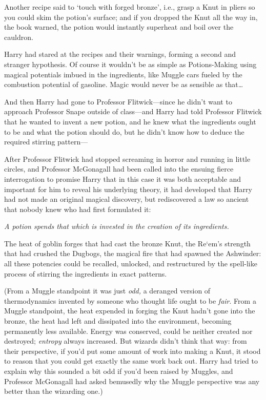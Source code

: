 Another recipe said to `touch with forged bronze', i.e., grasp a Knut in pliers 
so you could skim the potion's surface; and if you dropped the Knut all the way 
in, the book warned, the potion would instantly superheat and boil over the 
cauldron.

Harry had stared at the recipes and their warnings, forming a second and 
stranger hypothesis. Of course it wouldn't be as simple as Potions-Making using 
magical potentials imbued in the ingredients, like Muggle cars fueled by the 
combustion potential of gasoline. Magic would never be as sensible as 
that{\ldots}

And then Harry had gone to Professor Flitwick---since he didn't want to 
approach Professor Snape outside of class---and Harry had told Professor 
Flitwick that he wanted to invent a new potion, and he knew what the 
ingredients ought to be and what the potion should do, but he didn't know how 
to deduce the required stirring pattern---

After Professor Flitwick had stopped screaming in horror and running in little 
circles, and Professor McGonagall had been called into the ensuing fierce 
interrogation to promise Harry that in this case it was both acceptable and 
important for him to reveal his underlying theory, it had developed that Harry 
had not made an original magical discovery, but rediscovered a law so ancient 
that nobody knew who had first formulated it:

\emph{A potion spends that which is invested in the creation of its 
ingredients.}

The heat of goblin forges that had cast the bronze Knut, the Re`em's strength 
that had crushed the Dugbogs, the magical fire that had spawned the Ashwinder: 
all these potencies could be recalled, unlocked, and restructured by the 
spell-like process of stirring the ingredients in exact patterns.

(From a Muggle standpoint it was just \emph{odd,} a deranged version of 
thermodynamics invented by someone who thought life ought to be \emph{fair}. 
From a Muggle standpoint, the heat expended in forging the Knut hadn't gone 
into the bronze, the heat had left and dissipated into the environment, 
becoming permanently less available. Energy was conserved, could be neither 
created nor destroyed; \emph{entropy} always increased. But wizards didn't 
think that way: from their perspective, if you'd put some amount of work into 
making a Knut, it stood to reason that you could get exactly the same work back 
out. Harry had tried to explain why this sounded a bit odd if you'd been raised 
by Muggles, and Professor McGonagall had asked bemusedly why the Muggle 
perspective was any better than the wizarding one.)

